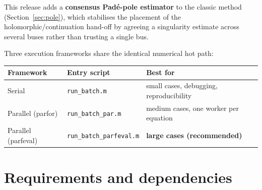 \documentclass[11pt,a4paper]{article}
\newcommand{\code}[1]{\texttt{#1}}
\begin{document}
This release adds a \textbf{consensus Pad\'e-pole estimator} to the classic method
(Section~\ref{sec:pole}), which stabilises the placement of the holomorphic/continuation
hand-off by agreeing a singularity estimate across several buses rather than trusting a
single bus.

Three execution frameworks share the identical numerical hot path:

\begin{center}
\begin{tabular}{@{}lll@{}}
\toprule
Framework & Entry script & Best for\\
\midrule
Serial            & \code{run_batch.m}          & small cases, debugging, reproducibility\\
Parallel (parfor) & \code{run_batch_par.m}      & medium cases, one worker per equation\\
Parallel (parfeval)& \code{run_batch_parfeval.m} & \textbf{large cases (recommended)}\\
\bottomrule
\end{tabular}
\end{center}

\section{Requirements and dependencies}
\end{document}

